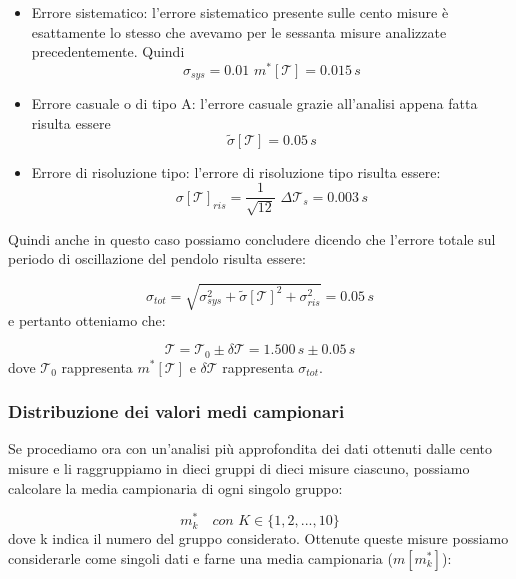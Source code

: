 \begin{itemize}
	\item{Errore sistematico: l'errore sistematico presente sulle cento misure è esattamente lo stesso che avevamo per le sessanta misure analizzate precedentemente. Quindi 
		\begin{equation}
			\sigma_{sys} = 0.01\,\,m^*[\mathcal{T}] = 0.015\,s
		\end{equation}	 }
	\item{Errore casuale o di tipo A: l'errore casuale grazie all'analisi appena fatta risulta essere
		\begin{equation}
			\tilde{\sigma}[\mathcal{T}] = 0.05\,s
		\end{equation}}
	\item{Errore di risoluzione tipo: l'errore di risoluzione tipo risulta essere:
		\begin{equation}
			 {\sigma}[\mathcal{T}]_{ris} = \frac{1}{\sqrt{12}} \,\, \Delta\mathcal{T}_{s} = 0.003\,s	
		\end{equation}}
\end{itemize}

Quindi anche in questo caso possiamo concludere dicendo che l'errore totale sul periodo di oscillazione del pendolo risulta essere:

\begin{equation}
	\sigma_{tot} = \sqrt{\sigma_{sys}^2 + \tilde{\sigma}[\mathcal{T}]^2 + \sigma_{ris}^2} = 0.05 \,s
\end{equation}
e pertanto otteniamo che:

\begin{equation}
	\mathcal{T} = \mathcal{T}_0 \pm \delta\mathcal{T} = 1.500\,s \pm 0.05\,s
\end{equation}
dove $\mathcal{T}_0$ rappresenta $m^*[\mathcal{T}]$ e $\delta\mathcal{T}$ rappresenta $\sigma_{tot}$.

\subsubsection{Distribuzione dei valori medi campionari}

Se procediamo ora con un'analisi più approfondita dei dati ottenuti dalle cento misure e li raggruppiamo in dieci gruppi di dieci misure ciascuno, possiamo calcolare la media campionaria di ogni singolo gruppo:

\begin{equation}
m_k^* \quad con \,\, K \in{\{1,2,...,10\}}
\end{equation}
dove k indica il numero del gruppo considerato.
Ottenute queste misure possiamo considerarle come singoli dati e farne una media campionaria ($ m[m_k^*] $):

